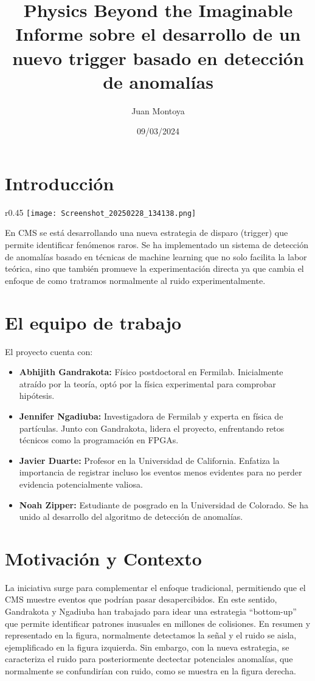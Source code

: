 \documentclass[a4paper,12pt]{article}
\title{Physics Beyond the Imaginable\\[0.5em]
\large Informe sobre el desarrollo de un nuevo trigger basado en detección de anomalías}
\author{Juan Montoya}
\date{09/03/2024}
\begin{document}
\maketitle
\section{Introducción}

\begin{wrapfigure}{r}{0.45\columnwidth}
    \vspace{-35pt}
    \texttt{[image: Screenshot\_20250228\_134138.png]}
\end{wrapfigure}

En CMS se está desarrollando una nueva estrategia de disparo (trigger) que permite identificar fenómenos raros. Se ha implementado un sistema de detección de anomalías basado en técnicas de machine learning que no solo facilita la labor teórica, sino que también promueve la experimentación directa ya que cambia el enfoque de como tratramos normalmente al ruido experimentalmente.

\vskip 1cm

\section{El equipo de trabajo}
El proyecto cuenta con:

\begin{itemize}
    \item \textbf{Abhijith Gandrakota:} Físico postdoctoral en Fermilab. Inicialmente atraído por la teoría, optó por la física experimental para comprobar hipótesis.
    \item \textbf{Jennifer Ngadiuba:} Investigadora de Fermilab y experta en física de partículas. Junto con Gandrakota, lidera el proyecto, enfrentando retos técnicos como la programación en FPGAs.
    \item \textbf{Javier Duarte:} Profesor en la Universidad de California. Enfatiza la importancia de registrar incluso los eventos menos evidentes para no perder evidencia potencialmente valiosa.
    \item \textbf{Noah Zipper:} Estudiante de posgrado en la Universidad de Colorado. Se ha unido al desarrollo del algoritmo de detección de anomalías.
\end{itemize}

\section{Motivación y Contexto}
La iniciativa surge para complementar el enfoque tradicional, permitiendo que el CMS muestre eventos que podrían pasar desapercibidos. En este sentido, Gandrakota y Ngadiuba han trabajado para idear una estrategia “bottom-up” que permite identificar patrones inusuales en millones de colisiones. En resumen y representado en la figura, normalmente detectamos la señal y el ruido se aisla, ejemplificado en la figura izquierda. Sin embargo, con la nueva estrategia, se caracteriza el ruido para posteriormente dectectar potenciales anomalías, que normalmente se confundirían con ruido, como se muestra en la figura derecha.
\end{document}
